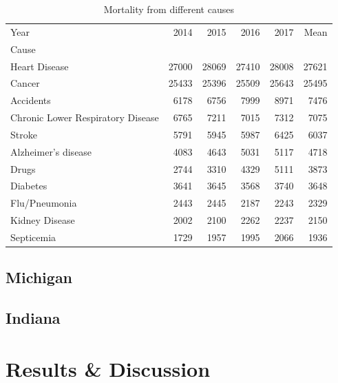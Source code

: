 \documentclass[conference]{IEEEtran}
\begin{document}
\begin{table}
  \centering
\begin{tabular}{lrrrrr}
\toprule
Year &   2014 &   2015 &   2016 &   2017 &   Mean \\
Cause                             &        &        &        &        &        \\
\midrule
Heart Disease                     &  27000 &  28069 &  27410 &  28008 &  27621 \\
Cancer                            &  25433 &  25396 &  25509 &  25643 &  25495 \\
Accidents                         &   6178 &   6756 &   7999 &   8971 &   7476 \\
Chronic Lower Respiratory Disease &   6765 &   7211 &   7015 &   7312 &   7075 \\
Stroke                            &   5791 &   5945 &   5987 &   6425 &   6037 \\
Alzheimer’s disease               &   4083 &   4643 &   5031 &   5117 &   4718 \\
Drugs                             &   2744 &   3310 &   4329 &   5111 &   3873 \\
Diabetes                          &   3641 &   3645 &   3568 &   3740 &   3648 \\
Flu/Pneumonia                     &   2443 &   2445 &   2187 &   2243 &   2329 \\
Kidney Disease                    &   2002 &   2100 &   2262 &   2237 &   2150 \\
Septicemia                        &   1729 &   1957 &   1995 &   2066 &   1936 \\
\bottomrule
\end{tabular}
\caption{Mortality from different causes \label{tab:mortalityStats}}
\end{table}

\subsection{Michigan}


\subsection{Indiana}






\blindenumerate[10]

\section{ Results \& Discussion }
\end{document}
